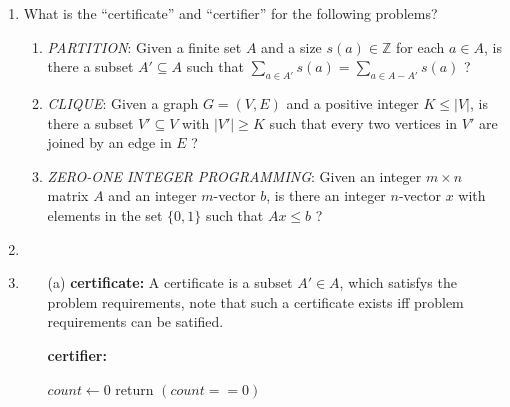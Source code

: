 \documentclass[12pt,a4paper]{article}
\makeatletter
\newtheorem*{solution}{Solution}
\theoremstyle{definition}
\renewenvironment{solution}[1][Solution] {\par\pushQED{\qed}\normalfont\topsep6\p@\@plus6\p@\relax\trivlist\item[\hskip\labelsep\bfseries#1\@addpunct{.}]\ignorespaces}{\popQED\endtrivlist\@endpefalse} \makeatother
\makeatother
\begin{document}
\begin{enumerate}
    \item
    What is the ``certificate'' and ``certifier'' for the following problems?
    \begin{enumerate}
        \item
        \emph{PARTITION}: Given a finite set $A$ and a size $s(a) \in \mathbb{Z}$ for each $a \in A$, is there a subset $A' \subseteq A$ such that $\sum_{a \in A'}s(a) = \sum_{a \in A-A'}s(a)$ ?

        \item
        \emph{CLIQUE}: Given a graph $G = (V, E)$ and a positive integer $K \leq |V|$, is there a subset $V' \subseteq V$ with $|V'| \geq K$ such that every two vertices in $V'$ are joined by an edge in $E$ ?

        \item
        \emph{ZERO-ONE INTEGER PROGRAMMING}: Given an integer $m \times n$ matrix $A$ and an integer $m$-vector $b$, is there an integer $n$-vector $x$ with elements in the set $\{0, 1\}$ such that $Ax \leq b$ ?
    \end{enumerate}

    \begin{solution}\item
    \renewcommand{\qedsymbol}{}
    \begin{itemize}
    \item [(a)] \textbf{certificate:} A certificate is a subset $A' \in A$, which satisfys the problem requirements, note that such a certificate exists iff problem requirements can be satified.\par
    \textbf{certifier:} \par 
        \begin{minipage}[t]{0.8\textwidth}
        \begin{algorithm}[H]
            \caption{$certifier\ 1$}
            \label{ALG1}
            $count \leftarrow 0$\;
            return $(count==0)$\;


\end{algorithm}
\end{minipage}
\end{itemize}
\end{solution}
\end{enumerate}
\end{document}
